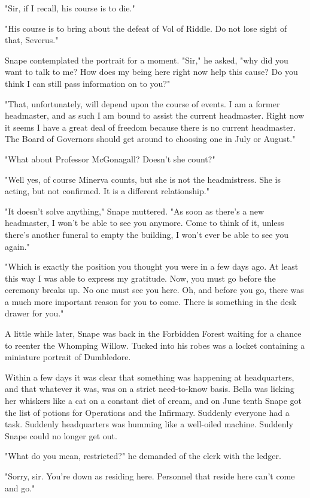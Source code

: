 "Sir, if I recall, his course is to die."

"His course is to bring about the defeat of Vol{\el} of Riddle. Do not lose sight of that, Severus."

Snape contemplated the portrait for a moment. "Sir," he asked, "why did you want to talk to me? How does my being here right now help this cause? Do you think I can still pass information on to you?"

"That, unfortunately, will depend upon the course of events. I am a former headmaster, and as such I am bound to assist the current headmaster. Right now it seems I have a great deal of freedom because there is no current headmaster. The Board of Governors should get around to choosing one in July or August."

"What about Professor McGonagall? Doesn't she count?"

"Well yes, of course Minerva counts, but she is not the headmistress. She is acting, but not confirmed. It is a different relationship."

"It doesn't solve anything," Snape muttered. "As soon as there's a new headmaster, I won't be able to see you anymore. Come to think of it, unless there's another funeral to empty the building, I won't ever be able to see you again."

"Which is exactly the position you thought you were in a few days ago. At least this way I was able to express my gratitude. Now, you must go before the ceremony breaks up. No one must see you here. Oh, and before you go, there was a much more important reason for you to come. There is something in the desk drawer for you."

A little while later, Snape was back in the Forbidden Forest waiting for a chance to reenter the Whomping Willow. Tucked into his robes was a locket containing a miniature portrait of Dumbledore.

Within a few days it was clear that something was happening at headquarters, and that whatever it was, was on a strict need-to-know basis. Bella was licking her whiskers like a cat on a constant diet of cream, and on June tenth Snape got the list of potions for Operations and the Infirmary. Suddenly everyone had a task. Suddenly headquarters was humming like a well-oiled machine. Suddenly Snape could no longer get out.

"What do you mean, restricted?" he demanded of the clerk with the ledger.

"Sorry, sir. You're down as residing here. Personnel that reside here can't come and go."

